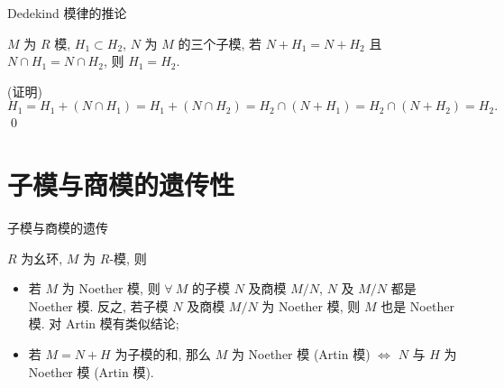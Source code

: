 
\begin{frame}{Dedekind 模律的推论}

\begin{cor}
$M$ 为 $R$ 模, $H_1 \subset H_2$, $N$ 为 $M$ 的三个子模,
若 $N + H_1 = N + H_2$ 且 $N \cap H_1 = N \cap H_2$, 则 $H_1 = H_2$.
\end{cor}

\startproof[bg=yellow, fg=red](证明)
\[
H_1 = H_1 + (N \cap H_1) = H_1 + (N \cap H_2)
= H_2 \cap (N + H_1) = H_2 \cap (N + H_2) = H_2.
\]
\qed

\end{frame}


\section[遗传性]{子模与商模的遗传性}


\begin{frame}{子模与商模的遗传}

\begin{lem}[子模与商模的遗传]
$R$ 为幺环, $M$ 为 $R$-模, 则
\begin{itemize}
\item[(i)] 若 $M$ 为 Noether 模, 则 $\forall\ M$ 的子模 $N$ 及商模 $M/N$,
  $N$ 及 $M/N$ 都是 Noether 模. 反之, 若子模 $N$ 及商模 $M/N$ 为 Noether 模,
  则 $M$ 也是 Noether 模. 对 Artin 模有类似结论;
\item[(ii)] 若 $M = N + H$ 为子模的和, 那么
  $M$ 为 Noether 模 (Artin 模) $\iff$ $N$ 与 $H$ 为 Noether 模 (Artin 模).
\end{itemize}
\end{lem}

\end{frame}


